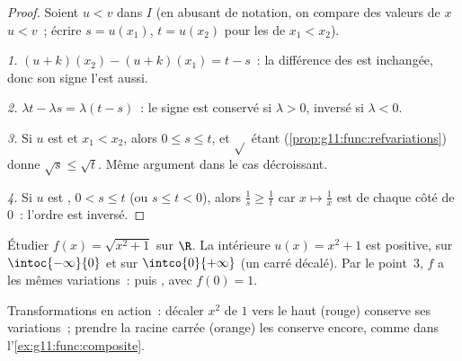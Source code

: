 \begin{proof}
Soient $u < v$ dans $I$ (en abusant de notation, on compare des valeurs
de $x$ $u < v$~; écrire $s = u(x_1)$, $t = u(x_2)$ pour les  de
$x_1 < x_2$).

\emph{1.} $(u+k)(x_2) - (u+k)(x_1) = t - s$~: la différence des 
est inchangée, donc son signe l'est aussi.

\emph{2.} $\lambda t - \lambda s = \lambda(t - s)$~: le signe est
conservé si $\lambda > 0$, inversé si $\lambda < 0$.

\emph{3.} Si $u$ est  et $x_1 < x_2$, alors $0 \leq s \leq t$,
et $\sqrt{}$ étant  (\cref{prop:g11:func:refvariations}) donne
$\sqrt s \leq \sqrt t$. Même argument dans le cas décroissant.

\emph{4.} Si $u$ est , $0 < s \leq t$ (ou $s \leq t < 0$),
alors $\frac1s \geq \frac1t$ car $x \mapsto \frac1x$ est 
de chaque côté de $0$~: l'ordre est inversé.
\end{proof}

\begin{example}\label{ex:g11:func:composite}
Étudier $f(x) = \sqrt{x^2 + 1}$ sur $\R$. La  intérieure
$u(x) = x^2 + 1$ est positive,  sur $\intoc{-\infty}{0}$ et
 sur $\intco{0}{+\infty}$ (un carré décalé). Par le point~3,
$f$ a les mêmes variations~:  puis , avec 
$f(0) = 1$.
\end{example}

\begin{omfigure}

{\small Transformations en action~: décaler $x^2$ de $1$ vers le haut
(rouge) conserve ses variations~; prendre la racine carrée (orange) les
conserve encore, comme dans l'\cref{ex:g11:func:composite}.}
\end{omfigure}

